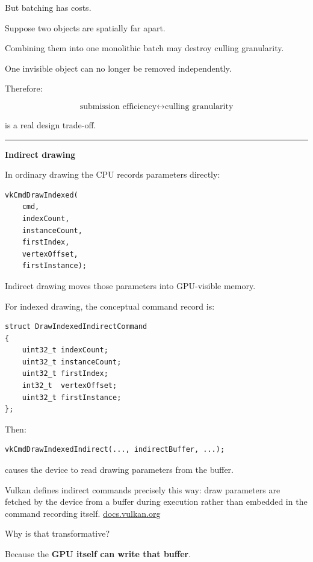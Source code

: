 But batching has costs.

Suppose two objects are spatially far apart.

Combining them into one monolithic batch may destroy culling granularity.

One invisible object can no longer be removed independently.

Therefore:

\[
\boxed{
\text{submission efficiency}
\leftrightarrow
\text{culling granularity}
}
\]

is a real design trade-off.

\begin{center}\rule{0.5\linewidth}{0.5pt}\end{center}

\textbf{Indirect drawing}

In ordinary drawing the CPU records parameters directly:

\begin{verbatim}
vkCmdDrawIndexed(
    cmd,
    indexCount,
    instanceCount,
    firstIndex,
    vertexOffset,
    firstInstance);
\end{verbatim}

Indirect drawing moves those parameters into GPU-visible memory.

For indexed drawing, the conceptual command record is:

\begin{verbatim}
struct DrawIndexedIndirectCommand
{
    uint32_t indexCount;
    uint32_t instanceCount;
    uint32_t firstIndex;
    int32_t  vertexOffset;
    uint32_t firstInstance;
};
\end{verbatim}

Then:

\begin{verbatim}
vkCmdDrawIndexedIndirect(..., indirectBuffer, ...);
\end{verbatim}

causes the device to read drawing parameters from the buffer.

Vulkan defines indirect commands precisely this way: draw parameters are fetched by the device from a buffer during execution rather than embedded in the command recording itself. \href{https://docs.vulkan.org/refpages/latest/refpages/source/vkCmdDrawIndirect.html?utm_source=chatgpt.com}{docs.vulkan.org}

Why is that transformative?

Because the \textbf{GPU itself can write that buffer}.


